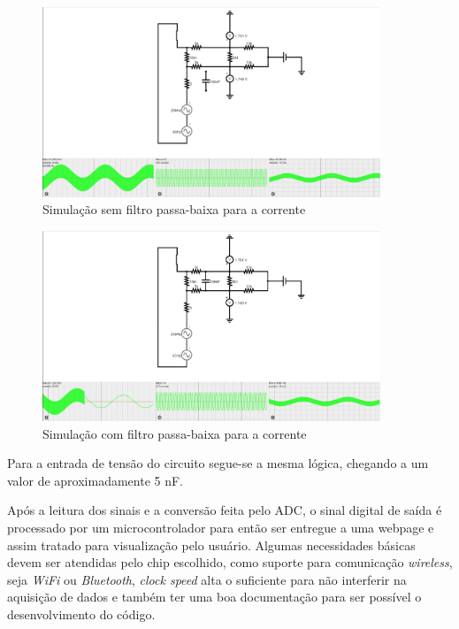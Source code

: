 \begin{figure}[htb!]
    \caption{Simulação sem filtro passa-baixa para a corrente}
    \label{fig:simco1}
    \includegraphics[width=0.9\textwidth]{figuras/sim-co-1.png}
    \fonte{}
\end{figure}

\begin{figure}[htb!]
    \caption{Simulação com filtro passa-baixa para a corrente}
    \label{fig:simco2}
    \includegraphics[width=0.9\textwidth]{figuras/sim-co-2.png}
    \fonte{}
\end{figure}

Para a entrada de tensão do circuito segue-se a mesma lógica, chegando a um valor de aproximadamente 5 nF.

Após a leitura dos sinais e a conversão feita pelo ADC, o sinal digital de saída é processado por um microcontrolador para então ser entregue a uma webpage e assim tratado para visualização pelo usuário. Algumas necessidades básicas devem ser atendidas pelo chip escolhido, como suporte para comunicação \textit{wireless}, seja \textit{WiFi} ou \textit{Bluetooth}, \textit{clock speed} alta o suficiente para não interferir na aquisição de dados e também ter uma boa documentação para ser possível o desenvolvimento do código.

